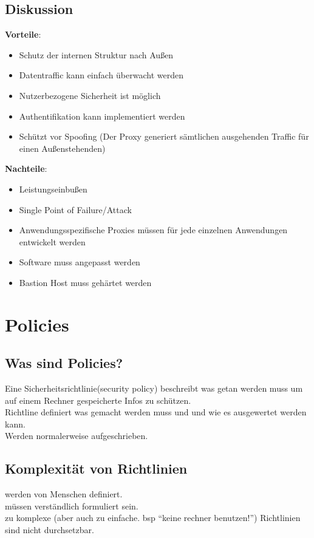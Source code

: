 \documentclass{article} %
\begin{document}
\subsection{Diskussion}
\textbf{Vorteile}:
	\begin{itemize}
	\item Schutz der internen Struktur nach Außen
	\item Datentraffic kann einfach überwacht werden
	\item Nutzerbezogene Sicherheit ist möglich
	\item Authentifikation kann implementiert werden
	\item Schützt vor Spoofing (Der Proxy generiert sämtlichen ausgehenden Traffic für einen Außenstehenden)
	\end{itemize}
\noindent\textbf{Nachteile}:
	\begin{itemize}
	\item Leistungseinbußen
	\item Single Point of Failure/Attack
	\item Anwendungsspezifische Proxies müssen für jede einzelnen Anwendungen entwickelt werden
	\item Software muss angepasst werden
	\item Bastion Host muss gehärtet werden
	\end{itemize}


\section{Policies}
\subsection{Was sind Policies?}
Eine Sicherheitsrichtlinie(security policy) beschreibt was getan werden muss um auf einem Rechner gespeicherte Infos zu schützen.\\
Richtline definiert was gemacht werden muss und und wie es ausgewertet werden kann.\\
Werden normalerweise aufgeschrieben.\\
\subsection{Komplexität von Richtlinien}
werden von Menschen definiert.\\
müssen verständlich formuliert sein.\\
zu komplexe (aber auch zu einfache. bsp "`keine rechner benutzen!"') Richtlinien sind nicht durchsetzbar.\\
\end{document}
